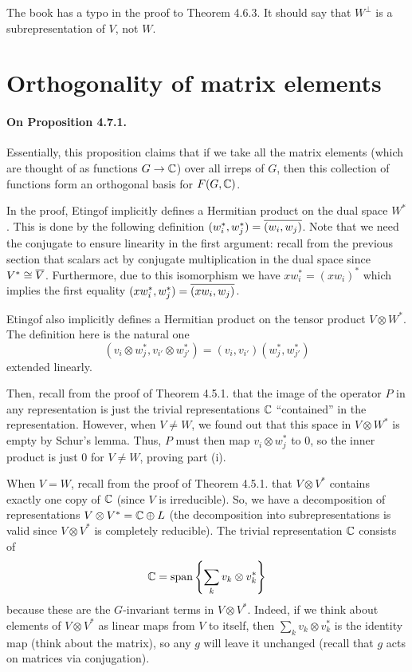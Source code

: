 \documentclass[oneside]{scrbook}
\begin{document}
\begin{remark}
The book has a typo in the proof to Theorem 4.6.3. It should say that $W^\perp$ is a subrepresentation of $V$, not $W$.
\end{remark}


\section{Orthogonality of matrix elements}
\paragraph{On Proposition 4.7.1.} Essentially, this proposition claims that if we take all the matrix elements (which are thought of as functions $G\to \mathbb C$) over all irreps of $G$, then this collection of functions form an orthogonal basis for $F(G,\mathbb C)$. 

In the proof, Etingof implicitly defines a Hermitian product on the dual space $W^*$. This is done by the following definition $(w_i^*,w_j^*)=\overline{(w_i,w_j)}$. Note that we need the conjugate to ensure linearity in the first argument: recall from the previous section that scalars act by conjugate multiplication in the dual space since $V^*\cong \overline{V}$. Furthermore, due to this isomorphism we have $xw_i^*=(xw_i)^*$ which implies the first equality $(xw_i^*,w_j^*)=\overline{(xw_i,w_j)}$. 

Etingof also implicitly defines a Hermitian product on the tensor product $V\otimes W^*$. The definition here is the natural one \[(v_i\otimes w_j^*,v_{i'}\otimes w_{j'}^*)=(v_i,v_{i'})(w_j^*,w_{j'}^*)\]
extended linearly. 

Then, recall from the proof of Theorem 4.5.1. that the image of the operator $P$ in any representation is just the trivial representations $\mathbb C$ ``contained'' in the representation. However, when $V\neq W$, we found out that this space in $V\otimes W^*$ is empty by Schur's lemma. Thus, $P$ must then map $v_i\otimes w_j^*$ to $0$, so the inner product is just $0$ for $V\neq W$, proving part (i).  

When $V=W$, recall from the proof of Theorem 4.5.1. that $V\otimes V^*$ contains exactly one copy of $\mathbb C$ (since $V$ is irreducible). So, we have a decomposition of representations $V\otimes V^*=\mathbb C\oplus L$ (the decomposition into subrepresentations is valid since $V\otimes V^*$ is completely reducible). The trivial representation $\mathbb C$ consists of
\[\mathbb C=\text{span}\left\{\sum_{k}v_k\otimes v_k^*\right\}\]
because these are the $G$-invariant terms in $V\otimes V^*$. Indeed, if we think about elements of $V\otimes V^*$ as linear maps from $V$ to itself, then $\sum_k v_k\otimes v_k^*$ is the identity map (think about the matrix), so any $g$ will leave it unchanged (recall that $g$ acts on matrices via conjugation). 
\end{document}
